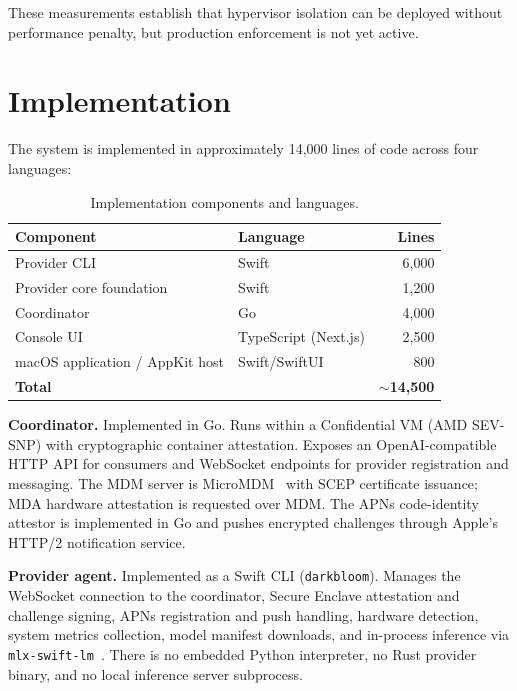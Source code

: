 \documentclass[10pt,twocolumn,letterpaper]{article}
\begin{document}
These measurements establish that hypervisor isolation can be deployed without performance penalty, but production enforcement is not yet active.

\section{Implementation}
\label{sec:impl}

The system is implemented in approximately 14,000 lines of code across four languages:

\begin{table}[h]
\centering
\caption{Implementation components and languages.}
\vspace{4pt}
\small
\begin{tabular}{@{}llr@{}}
\toprule
\textbf{Component} & \textbf{Language} & \textbf{Lines} \\
\midrule
Provider CLI & Swift & 6,000 \\
Provider core foundation & Swift & 1,200 \\
Coordinator & Go & 4,000 \\
Console UI & TypeScript (Next.js) & 2,500 \\
macOS application / AppKit host & Swift/SwiftUI & 800 \\
\midrule
\textbf{Total} && \textbf{$\sim$14,500} \\
\bottomrule
\end{tabular}
\end{table}

\textbf{Coordinator.} Implemented in Go. Runs within a Confidential VM (AMD SEV-SNP) with cryptographic container attestation. Exposes an OpenAI-compatible HTTP API for consumers and WebSocket endpoints for provider registration and messaging. The MDM server is MicroMDM~\cite{micromdm} with SCEP certificate issuance; MDA hardware attestation is requested over MDM. The APNs code-identity attestor is implemented in Go and pushes encrypted challenges through Apple's HTTP/2 notification service.

\textbf{Provider agent.} Implemented as a Swift CLI (\texttt{darkbloom}). Manages the WebSocket connection to the coordinator, Secure Enclave attestation and challenge signing, APNs registration and push handling, hardware detection, system metrics collection, model manifest downloads, and in-process inference via \texttt{mlx-swift-lm}~\cite{mlx}. There is no embedded Python interpreter, no Rust provider binary, and no local inference server subprocess.
\end{document}
